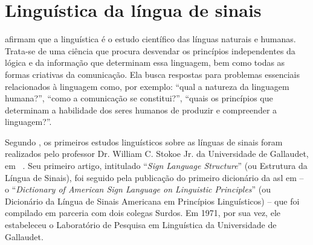 \section{Linguística da língua de sinais}
\label{sec:linguistica}

 afirmam que a linguística é o estudo científico das línguas naturais e humanas. Trata-se de uma ciência que procura desvendar os princípios independentes da lógica e da informação que determinam essa linguagem, bem como todas as formas criativas da comunicação.
Ela busca respostas para problemas essenciais relacionados à linguagem como, por exemplo: ``qual a natureza da linguagem humana?'',  ``como a comunicação se constitui?'', ``quais os princípios que determinam a habilidade dos seres humanos de produzir e compreender a linguagem?''.


% 


Segundo , os primeiros estudos linguísticos sobre as línguas de sinais foram realizados pelo professor Dr. William C. Stokoe Jr. da Universidade de Gallaudet, em ~\citeyear{stokoe-1960-sl-structure}. 
Seu primeiro artigo, intitulado ``\textit{Sign Language Structure}'' (ou Estrutura da Língua de Sinais), foi seguido pela publicação do primeiro dicionário da \acrfull{asl} em \citeyear{stokoe-1965-dictionary-asl} -- o ``\textit{Dictionary of American Sign Language on Linguistic Principles}'' (ou Dicionário da Língua de Sinais Americana em Princípios Linguísticos) -- que foi compilado em parceria com dois colegas Surdos. Em 1971, por sua vez, ele estabeleceu o Laboratório de Pesquisa em Linguística da Universidade de Gallaudet.

